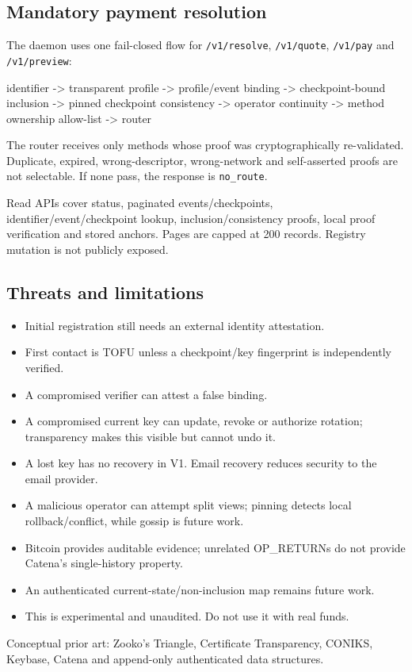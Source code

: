\documentclass[
]{article}
\newenvironment{Shaded}{}{}
\newcommand{\NormalTok}[1]{#1}
\providecommand{\tightlist}{%
  \setlength{\itemsep}{0pt}\setlength{\parskip}{0pt}}
\begin{document}
\hypertarget{mandatory-payment-resolution}{%
\subsection{Mandatory payment
resolution}\label{mandatory-payment-resolution}}

The daemon uses one fail-closed flow for \texttt{/v1/resolve},
\texttt{/v1/quote}, \texttt{/v1/pay} and \texttt{/v1/preview}:

\begin{Shaded}
\begin{Highlighting}[]
\NormalTok{identifier {-}\textgreater{} transparent profile {-}\textgreater{} profile/event binding}
\NormalTok{{-}\textgreater{} checkpoint{-}bound inclusion {-}\textgreater{} pinned checkpoint consistency}
\NormalTok{{-}\textgreater{} operator continuity {-}\textgreater{} method ownership allow{-}list {-}\textgreater{} router}
\end{Highlighting}
\end{Shaded}

The router receives only methods whose proof was cryptographically
re-validated. Duplicate, expired, wrong-descriptor, wrong-network and
self-asserted proofs are not selectable. If none pass, the response is
\texttt{no\_route}.

Read APIs cover status, paginated events/checkpoints,
identifier/event/checkpoint lookup, inclusion/consistency proofs, local
proof verification and stored anchors. Pages are capped at 200 records.
Registry mutation is not publicly exposed.

\hypertarget{threats-and-limitations}{%
\subsection{Threats and limitations}\label{threats-and-limitations}}

\begin{itemize}
\tightlist
\item
  Initial registration still needs an external identity attestation.
\item
  First contact is TOFU unless a checkpoint/key fingerprint is
  independently verified.
\item
  A compromised verifier can attest a false binding.
\item
  A compromised current key can update, revoke or authorize rotation;
  transparency makes this visible but cannot undo it.
\item
  A lost key has no recovery in V1. Email recovery reduces security to
  the email provider.
\item
  A malicious operator can attempt split views; pinning detects local
  rollback/conflict, while gossip is future work.
\item
  Bitcoin provides auditable evidence; unrelated OP\_RETURNs do not
  provide Catena's single-history property.
\item
  An authenticated current-state/non-inclusion map remains future work.
\item
  This is experimental and unaudited. Do not use it with real funds.
\end{itemize}

Conceptual prior art: Zooko's Triangle, Certificate Transparency,
CONIKS, Keybase, Catena and append-only authenticated data structures.
\end{document}
